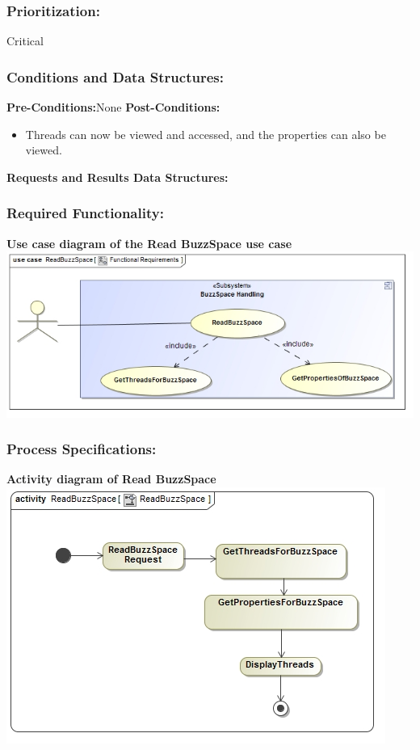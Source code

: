 \documentclass[a4paper,11pt]{article}
\begin{document}
\subsubsection{Prioritization:} Critical
\subsubsection{Conditions and Data Structures:}
\textbf{Pre-Conditions:}None 
\textbf{Post-Conditions:}
\begin{itemize}
	\item Threads can now be viewed and accessed, and the properties can also be viewed.
\end{itemize}
\textbf{Requests and Results Data Structures:}
\subsubsection{Required Functionality:} 
\textbf{Use case diagram of the Read BuzzSpace use case}\\ 
\includegraphics[width=1\linewidth]{./Images/BuzzSpaceHandling/buzzSpaceRead.jpg}\\
\subsubsection{Process Specifications:} 
\textbf{Activity diagram of Read BuzzSpace}\\ 
\includegraphics[width=1\linewidth]{./Images/BuzzSpaceHandling/buzzSpaceReadAct.jpg}\\
\end{document}
